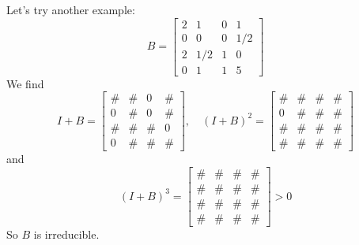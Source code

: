 \begin{xexample}
Let's try another example:
\begin{equation}
  B = \begin{bmatrix}
            2 & 1 & 0 & 1 \\
            0 & 0 & 0 & 1/2 \\
            2 & 1/2 & 1 & 0 \\
            0 & 1  & 1 & 5
      \end{bmatrix}
\end{equation}
We find
\begin{equation}
  I+B =
      \begin{bmatrix}
            \# & \#  & 0 & \# \\
            0  & \#  & 0 & \# \\
            \# & \#  & \# & 0 \\
            0 & \#  & \# & \#
      \end{bmatrix},
  \quad
  (I+B)^2 =
      \begin{bmatrix}
            \# & \#  & \# & \# \\
            0  & \#  & \# & \# \\
            \# & \#  & \# & \# \\
            \# & \#  & \# & \#
      \end{bmatrix}
\end{equation}
and
\begin{equation}
  (I+B)^3 =
      \begin{bmatrix}
            \# & \#  & \# & \# \\
            \# & \#  & \# & \# \\
            \# & \#  & \# & \# \\
            \# & \#  & \# & \#
      \end{bmatrix} > 0
\end{equation}
So $B$ is irreducible.
\end{xexample}

